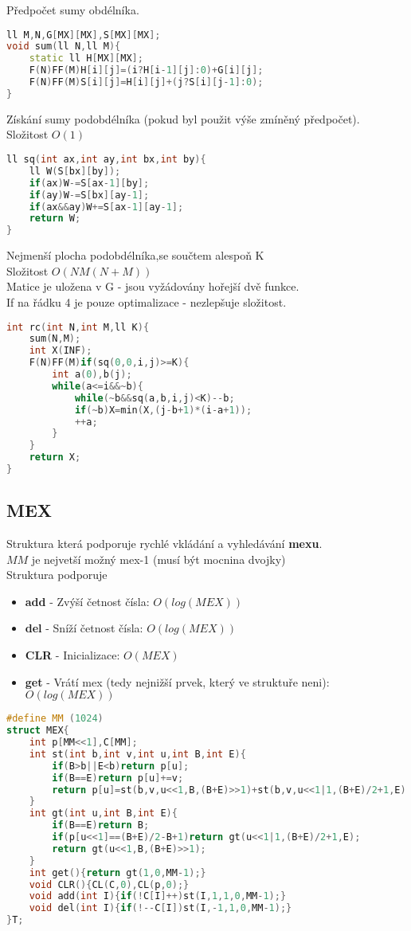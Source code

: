 \documentclass[11pt]{article}
\begin{document}
Předpočet sumy obdélníka.
\begin{lstlisting}[language=C++]
ll M,N,G[MX][MX],S[MX][MX];
void sum(ll N,ll M){
    static ll H[MX][MX];
    F(N)FF(M)H[i][j]=(i?H[i-1][j]:0)+G[i][j];
    F(N)FF(M)S[i][j]=H[i][j]+(j?S[i][j-1]:0);
}
\end{lstlisting}
Získání sumy podobdélníka (pokud byl použit výše zmíněný předpočet).
\\Složitost $O(1)$
\begin{lstlisting}[language=C++]
ll sq(int ax,int ay,int bx,int by){
    ll W(S[bx][by]);
    if(ax)W-=S[ax-1][by];
    if(ay)W-=S[bx][ay-1];
    if(ax&&ay)W+=S[ax-1][ay-1];
    return W;
}
\end{lstlisting}
Nejmenší plocha podobdélníka,se součtem alespoň \textsf{K}
\\Složitost $O(NM(N+M))$
\\Matice je uložena v \textsf{G} - jsou vyžádovány hořejší dvě funkce.
\\If na řádku 4 je pouze optimalizace - nezlepšuje složitost.
\begin{lstlisting}[language=C++]
int rc(int N,int M,ll K){
	sum(N,M);
    int X(INF);
    F(N)FF(M)if(sq(0,0,i,j)>=K){
        int a(0),b(j);
        while(a<=i&&~b){
            while(~b&&sq(a,b,i,j)<K)--b;
            if(~b)X=min(X,(j-b+1)*(i-a+1));
            ++a;
        }
    }
    return X;
}
\end{lstlisting}
\subsection{MEX}
Struktura která podporuje rychlé vkládání a vyhledávání \textbf{mexu}.
\\$MM$ je nejvetší možný mex-1 (musí být mocnina dvojky)
\\Struktura podporuje
\begin{itemize}
\item \textbf{add} - Zvýší četnost čísla: $O(log(MEX))$
\item \textbf{del} - Sníží četnost čísla: $O(log(MEX))$
\item \textbf{CLR} - Inicializace: $O(MEX)$
\item \textbf{get} - Vrátí mex (tedy nejnižší prvek, který ve struktuře neni): $O(log(MEX))$
\end{itemize}
\begin{lstlisting}[language=C++]
#define MM (1024)
struct MEX{
    int p[MM<<1],C[MM];
    int st(int b,int v,int u,int B,int E){
        if(B>b||E<b)return p[u];
        if(B==E)return p[u]+=v;
        return p[u]=st(b,v,u<<1,B,(B+E)>>1)+st(b,v,u<<1|1,(B+E)/2+1,E);
    }
    int gt(int u,int B,int E){
        if(B==E)return B;
        if(p[u<<1]==(B+E)/2-B+1)return gt(u<<1|1,(B+E)/2+1,E);
        return gt(u<<1,B,(B+E)>>1);
    }
    int get(){return gt(1,0,MM-1);}
    void CLR(){CL(C,0),CL(p,0);}
    void add(int I){if(!C[I]++)st(I,1,1,0,MM-1);}
    void del(int I){if(!--C[I])st(I,-1,1,0,MM-1);}
}T;
\end{lstlisting}
\end{document}
